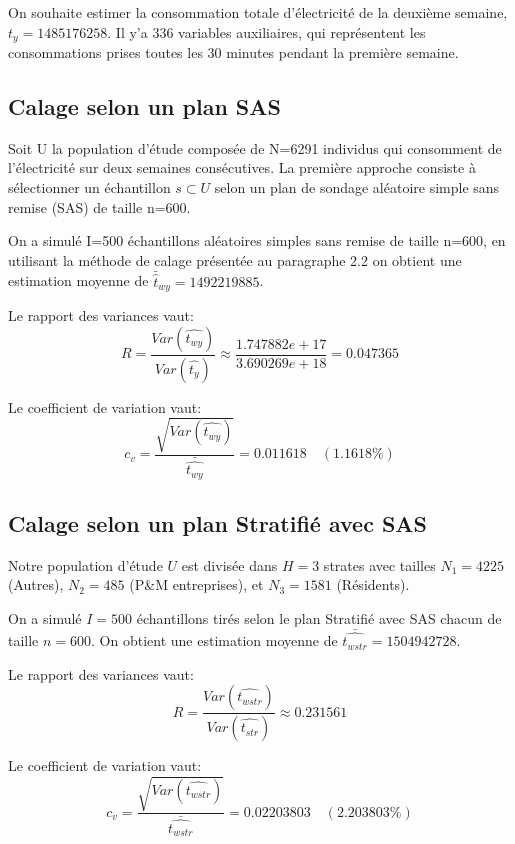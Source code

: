 On souhaite estimer la consommation totale d'électricité de la deuxième semaine, $t_y=1485176258$. Il y'a 336 variables auxiliaires, qui représentent les consommations prises toutes les 30 minutes pendant la première semaine.

\subsection{Calage selon un plan SAS}

Soit U la population d'étude composée de N=6291 individus qui consomment de l'électricité sur deux semaines consécutives. La première approche consiste à sélectionner un échantillon $s \subset U$ selon un plan de sondage aléatoire simple sans remise (SAS) de taille n=600.

On a simulé I=500 échantillons aléatoires simples sans remise de taille n=600, en utilisant la méthode de calage présentée au paragraphe 2.2 on obtient une estimation moyenne de $\bar{\hat{t}}_{wy}=1492219885$.

Le rapport des variances vaut:
\begin{equation*}
R=\frac{Var(\hat{t_{wy}})}{Var(\hat{t_y})}\approx\frac{1.747882e+17}{3.690269e+18}= 0.047365
\end{equation*}

Le coefficient de variation vaut:
\begin{equation*}
c_v=\frac{\sqrt{Var(\hat{t_{wy}})}}{\bar{\hat{t_{wy}}}} = 0.011618 \quad (1.1618\%)
\end{equation*}

\subsection{Calage selon un plan Stratifié avec SAS}

Notre population d'étude $U$ est divisée dans $H=3$ strates avec tailles $N_1=4225$ (Autres), $N_2=485$ (P\&M entreprises), et $N_3=1581$ (Résidents).

On a simulé $I=500$ échantillons tirés selon le plan Stratifié avec SAS chacun de taille $n=600$.
On obtient une estimation moyenne de $\bar{\hat{t_{wstr}}}=1504942728$.

Le rapport des variances vaut:
\begin{equation*}
R=\frac{Var(\hat{t_{wstr}})}{Var(\hat{t_{str}})}\approx 0.231561
\end{equation*}

Le coefficient de variation vaut:
\begin{equation*}
c_v=\frac{\sqrt{Var(\hat{t_{wstr}})}}{\bar{\hat{t_{wstr}}}} = 0.02203803 \quad (2.203803\%)
\end{equation*}

